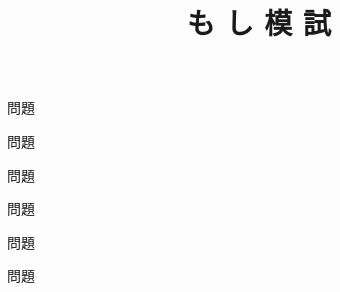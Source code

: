 \documentclass[uplatex,b5paper]{jsarticle}
\title{も し 模 試}
\begin{document}
\maketitle

\begin{prob}{10}
  問題
\end{prob}
\begin{prob}{10}
  問題
\end{prob}
\begin{prob}{10}
  問題
\end{prob}
\begin{prob}{10}
  問題
\end{prob}
\begin{prob}{10}
  問題
\end{prob}
\begin{prob}{10}
  問題
\end{prob}
\probends
\end{document}
